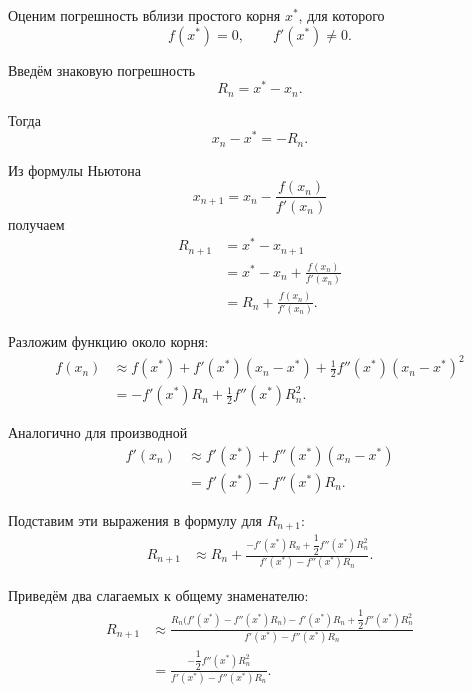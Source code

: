 \documentclass[../final.tex]{subfiles}
\begin{document}
Оценим погрешность вблизи простого корня $x^*$, для которого
%
\begin{equation*}
    f(x^*)=0,
    \qquad
    f'(x^*)\neq0.
\end{equation*}

Введём знаковую погрешность
%
\begin{equation*}
    R_n=x^*-x_n.
\end{equation*}

Тогда
%
\begin{equation*}
    x_n-x^*=-R_n.
\end{equation*}

Из формулы Ньютона
%
\begin{equation*}
    x_{n+1}
    =
    x_n
    -
    \frac{f(x_n)}{f'(x_n)}
\end{equation*}
%
получаем
%
\begin{align*}
    R_{n+1}
    &=
    x^*-x_{n+1}
    \\
    &=
    x^*-x_n
    +
    \frac{f(x_n)}{f'(x_n)}
    \\
    &=
    R_n
    +
    \frac{f(x_n)}{f'(x_n)}.
\end{align*}

Разложим функцию около корня:
%
\begin{align*}
    f(x_n)
    &\approx
    f(x^*)
    +
    f'(x^*)(x_n-x^*)
    +
    \frac12 f''(x^*)(x_n-x^*)^2
    \\
    &=
    -f'(x^*)R_n
    +
    \frac12 f''(x^*)R_n^2.
\end{align*}

Аналогично для производной
%
\begin{align*}
    f'(x_n)
    &\approx
    f'(x^*)
    +
    f''(x^*)(x_n-x^*)
    \\
    &=
    f'(x^*)
    -
    f''(x^*)R_n.
\end{align*}

Подставим эти выражения в формулу для $R_{n+1}$:
%
\begin{align*}
    R_{n+1}
    &\approx
    R_n
    +
    \frac{
        -f'(x^*)R_n
        +
        \dfrac12 f''(x^*)R_n^2
    }{
        f'(x^*)
        -
        f''(x^*)R_n
    }.
\end{align*}

Приведём два слагаемых к общему знаменателю:
%
\begin{align*}
    R_{n+1}
    &\approx
    \frac{
        R_n\bigl(f'(x^*)-f''(x^*)R_n\bigr)
        -
        f'(x^*)R_n
        +
        \dfrac12 f''(x^*)R_n^2
    }{
        f'(x^*)-f''(x^*)R_n
    }
    \\
    &=
    \frac{
        -\dfrac12 f''(x^*)R_n^2
    }{
        f'(x^*)-f''(x^*)R_n
    }.
\end{align*}
\end{document}
